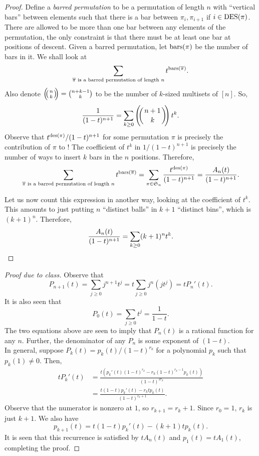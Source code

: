 	\begin{proof}
		Define a \emph{barred permutation} to be a permutation of length $n$ with ``vertical bars'' between elements such that there is a bar between $\pi_i,\pi_{i+1}$ if $i \in \operatorname{DES}(\pi)$. There are allowed to be more than one bar between any elements of the permutation, the only constraint is that there must be at least one bar at positions of descent. Given a barred permutation, let $\operatorname{bars}(\pi)$ be the number of bars in it. We shall look at
		\begin{equation}
			\label{eqn: counting to carlitz identity}
			\sum_{\overline{\pi} \text{ is a barred permutation of length $n$}} t^{\operatorname{bars}(\overline{\pi})}.
		\end{equation}
		Also denote $\mbinom{n}{k} = \binom{n+k-1}{k}$ to be the number of $k$-sized multisets of $[n]$. So,
		\[ \frac{1}{(1-t)^{n+1}} = \sum_{k \ge 0} \mbinom{n+1}{k} t^k. \]
		Observe that $t^{\operatorname{des}(\pi)}/(1-t)^{n+1}$ for some permutation $\pi$ is precisely the contribution of $\pi$ to ! The coefficient of $t^k$ in $1/(1-t)^{n+1}$ is precisely the number of ways to insert $k$ bars in the $n$ positions. Therefore,
		\[ \sum_{\overline{\pi} \text{ is a barred permutation of length $n$}} t^{\operatorname{bars}(\overline{\pi})} = \sum_{\pi \in \mathfrak{S}_n} \frac{t^{\operatorname{des}(\pi)}}{(1-t)^{n+1}} = \frac{A_n(t)}{(1-t)^{n+1}}. \]

		Let us now count this expression in another way, looking at the coefficient of $t^k$. This amounts to just putting $n$ ``distinct balls'' in $k+1$ ``distinct bins'', which is $(k+1)^n$. Therefore,
		\[ \frac{A_n(t)}{(1-t)^{n+1}} = \sum_{k \ge 0} (k+1)^n t^k. \qedhere \] 
	\end{proof}

	\begin{proof}[Proof due to class]
		Observe that
		\[ P_{n+1}(t) = \sum_{j \ge 0} j^{n+1} t^j = t \sum_{j \ge 0} j^n (jt^j) = t P_n'(t). \]
		It is also seen that
		\[ P_0(t) = \sum_{j \ge 0} t^j = \frac{1}{1-t}. \]
		The two equations above are seen to imply that $P_n(t)$ is a rational function for any $n$. Further, the denominator of any $P_n$ is some exponent of $(1-t)$. \\
		In general, suppose $P_k(t) = p_k(t)/(1-t)^{r_k}$ for a polynomial $p_k$ such that $p_k(1) \ne 0$. Then,
		\begin{align*}
			tP_k'(t) &= \frac{t \left( p_k'(t) (1-t)^{r_k} - r_k (1-t)^{r_k - 1} p_k(t) \right)}{(1-t)^{2r_k}} \\
				&= \frac{ t(1-t)p_k'(t) - r_k t p_k(t) }{(1-t)^{r_k+1}}.
		\end{align*}
		Observe that the numerator is nonzero at $1$, so $r_{k+1} = r_k + 1$. Since $r_0 = 1$, $r_k$ is just $k+1$. We also have
		\[ p_{k+1}(t) = t (1-t) p_k'(t) - (k+1) t p_k(t). \]
		It is seen that this recurrence is satisfied by $tA_n(t)$ and $p_1(t) = tA_1(t)$, completing the proof.
	\end{proof}

